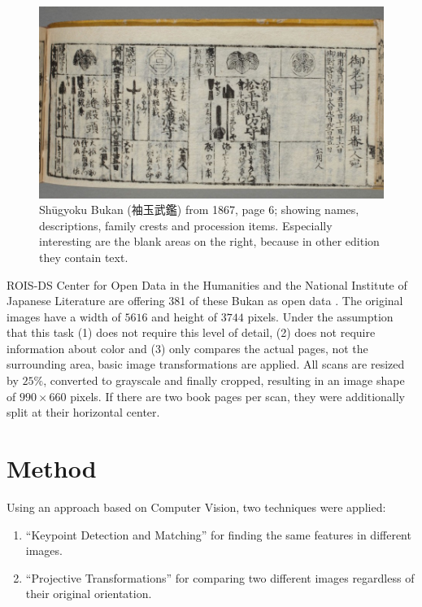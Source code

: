 \documentclass{ltjarticle}
\begin{document}
\begin{figure}
    \centering
    \includegraphics[width=\textwidth]{200019649_00006}
    \caption[Shūgyoku Bukan (袖玉武鑑), page 6]{Shūgyoku Bukan (袖玉武鑑) from 1867, page 6; showing names, descriptions, family crests and procession items. Especially interesting are the blank areas on the right, because in other edition they contain text.}
    \label{fig:shuugyokubukan006}
\end{figure}

ROIS-DS Center for Open Data in the Humanities and the National Institute of Japanese Literature are offering 381 of these Bukan as open data \cite{pmjt} \cite{codh2018bukan}. The original images have a width of $5616$ and height of $3744$ pixels. Under the assumption that this task (1) does not require this level of detail, (2) does not require information about color and (3) only compares the actual pages, not the surrounding area, basic image transformations are applied. All scans are resized by $25\%$, converted to grayscale and finally cropped, resulting in an image shape of $990 \times 660$ pixels. If there are two book pages per scan, they were additionally split at their horizontal center.

\section{Method}

Using an approach based on Computer Vision, two techniques were applied:

\begin{enumerate}
    \item “Keypoint Detection and Matching” for finding the same features in different images.
    \item “Projective Transformations” for comparing two different images regardless of their original orientation.
\end{enumerate}
\end{document}
